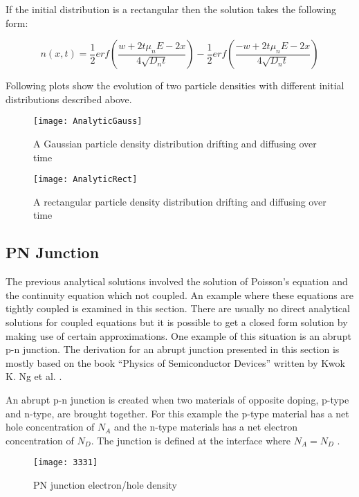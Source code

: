 \begin{doublespace}
If the initial distribution is a rectangular then the solution takes the following form:

\begin{equation}
n(x,t)=\frac{1}{2} erf(\frac{w+2t \mu_n E-2x}{4\sqrt{D_n t}})-\frac{1}{2}erf(\frac{-w+2t \mu_n E-2x}{4\sqrt{D_n t}}) 
\end{equation}

Following plots show the evolution of two particle densities with  different initial distributions described above.

\begin{figure}[!htp]
\centering
\texttt{[image: AnalyticGauss]}
\caption{A Gaussian particle density distribution drifting and diffusing over time} 
\end{figure}

\begin{figure}[!htp]
\centering
\texttt{[image: AnalyticRect]}
\caption{A rectangular particle density distribution drifting and diffusing over time} 
\end{figure}
\clearpage
\subsection{PN Junction}
The previous analytical solutions involved the solution of Poisson's equation and the continuity equation which  not coupled. An example where these equations are tightly coupled is examined in this section. There are usually no direct analytical solutions for coupled equations but it is possible to get a closed form solution by making use of certain approximations. One example of this situation is an abrupt p-n junction. The derivation for an abrupt junction presented in this section is mostly based on the book ``Physics of Semiconductor Devices'' written by Kwok K. Ng et al. \cite{Physem}. 

An abrupt p-n junction is created when two materials of opposite doping, p-type and n-type, are brought together. For this example the p-type material has a net hole concentration of $N_{A}$ and the n-type materials has a net electron concentration of $N_{D}$. The junction is defined at the interface where $N_A=N_D$ \cite{Physem}. 

\begin{figure}[!htp]
\centering
\texttt{[image: 3331]}
\caption{PN junction electron/hole density} 
\end{figure}


\end{doublespace}
